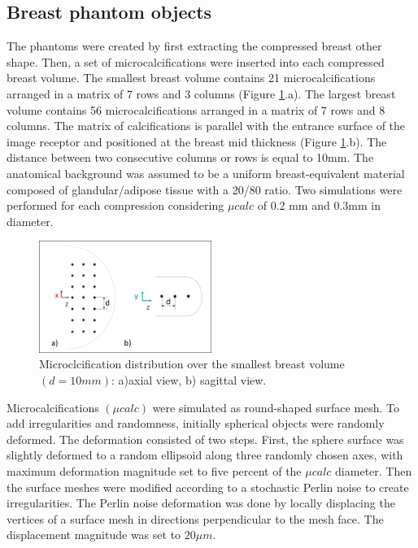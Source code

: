 \subsection{Breast phantom objects}

The phantoms were created by first extracting the compressed breast other shape. Then, a set of microcalcifications were inserted into each compressed breast volume. The smallest breast volume contains 21 microcalcifications arranged in a matrix of 7 rows and 3 columns (Figure \ref{fig:microcalcifications}.a). The largest breast volume contains 56 microcalcifications arranged in a matrix of 7 rows and 8 columns. The matrix of calcifications is parallel with the entrance surface of the image receptor and positioned at the breast mid thickness (Figure \ref{fig:microcalcifications}.b). The distance between two consecutive columns or rows is equal to 10mm. The anatomical background was assumed to be a uniform breast-equivalent material composed of glandular/adipose tissue with a 20/80 ratio. Two simulations were performed for each compression considering $\mu calc$ of 0.2 mm and 0.3mm in diameter.

\begin{figure}[!h]
\centering
\includegraphics[width=0.5\textwidth,keepaspectratio]{figures/microcalcifications.png} 
\caption{Microclcification distribution over the smallest breast volume $(d=10mm)$: a)axial view, b) sagittal view.}\label{fig:microcalcifications}
\end{figure}


Microcalcifications $(\mu calc)$ were simulated as round-shaped surface mesh. To add irregularities and randomness, initially spherical objects were randomly deformed. The deformation consisted of two steps. First, the sphere surface was slightly deformed to a random ellipsoid along three randomly chosen axes, with maximum deformation magnitude set to five percent of the $\mu calc$ diameter. Then the surface meshes were modified according to a stochastic Perlin noise to create irregularities. The Perlin noise deformation was done by locally displacing the vertices of a surface mesh in directions perpendicular to the mesh face. The displacement magnitude was set to $20 \mu m$.

